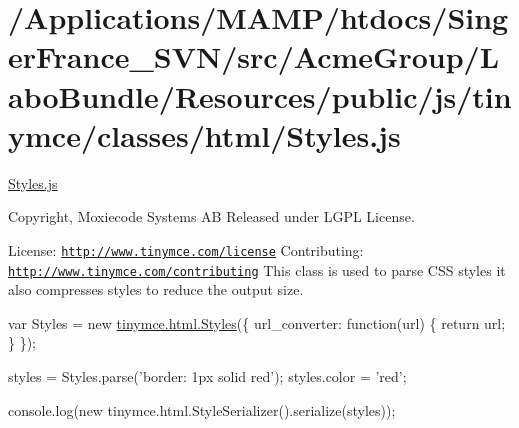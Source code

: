 \hypertarget{_2_applications_2_m_a_m_p_2htdocs_2_singer_france__s_v_n_2src_2_acme_group_2_labo_bundle_2_resou723ce03bdfbe566b9a2764ca61591677}{\section{/\+Applications/\+M\+A\+M\+P/htdocs/\+Singer\+France\+\_\+\+S\+V\+N/src/\+Acme\+Group/\+Labo\+Bundle/\+Resources/public/js/tinymce/classes/html/\+Styles.\+js}
}
\hyperlink{_styles_8js}{Styles.\+js}

Copyright, Moxiecode Systems A\+B Released under L\+G\+P\+L License.

License\+: \href{http://www.tinymce.com/license}{\tt http\+://www.\+tinymce.\+com/license} Contributing\+: \href{http://www.tinymce.com/contributing}{\tt http\+://www.\+tinymce.\+com/contributing} This class is used to parse C\+S\+S styles it also compresses styles to reduce the output size.

var Styles = new \hyperlink{classtinymce_1_1html_1_1_styles}{tinymce.\+html.\+Styles}(\{ url\+\_\+converter\+: function(url) \{ return url; \} \});

styles = Styles.\+parse('border\+: 1px solid red'); styles.\+color = 'red';

console.\+log(new tinymce.\+html.\+Style\+Serializer().serialize(styles));


\begin{DoxyCodeInclude}
\end{DoxyCodeInclude}
 